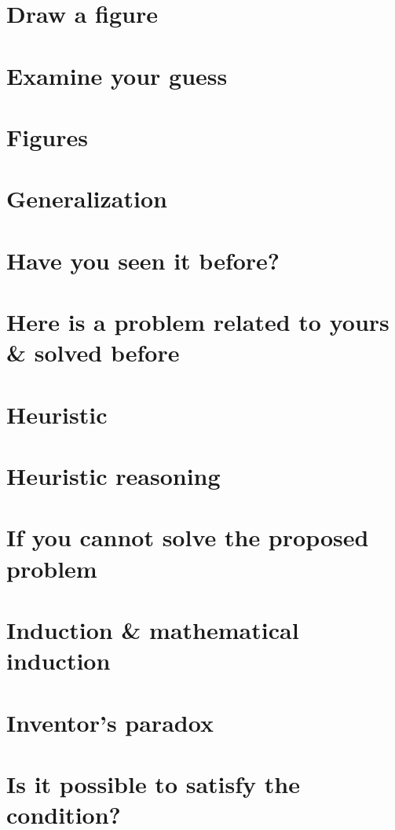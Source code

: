 \documentclass[oneside]{book}
\numberwithin{equation}{section}
\begin{document}
\section{Draw a figure}

\section{Examine your guess}

\section{Figures}

\section{Generalization}

\section{Have you seen it before?}

\section{Here is a problem related to yours \& solved before}

\section{Heuristic}

\section{Heuristic reasoning}

\section{If you cannot solve the proposed problem}

\section{Induction \& mathematical induction}

\section{Inventor's paradox}

\section{Is it possible to satisfy the condition?}
\end{document}
